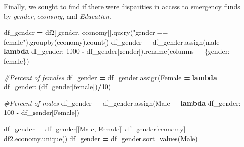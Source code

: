 \documentclass[water,article,submit,moreauthors,pdftex]{mdpi}
\newenvironment{Shaded}{\begin{snugshade}}{\end{snugshade}}
\newcommand{\CommentTok}[1]{\textcolor[rgb]{0.56,0.35,0.01}{\textit{#1}}}
\newcommand{\DecValTok}[1]{\textcolor[rgb]{0.00,0.00,0.81}{#1}}
\newcommand{\KeywordTok}[1]{\textcolor[rgb]{0.13,0.29,0.53}{\textbf{#1}}}
\newcommand{\NormalTok}[1]{#1}
\newcommand{\OperatorTok}[1]{\textcolor[rgb]{0.81,0.36,0.00}{\textbf{#1}}}
\newcommand{\StringTok}[1]{\textcolor[rgb]{0.31,0.60,0.02}{#1}}
\begin{document}
Finally, we sought to find if there were disparities in access to
emergency funds by \emph{gender}, \emph{economy}, and \emph{Education}.

\begin{Shaded}
\begin{Highlighting}[]
\NormalTok{df\_gender }\OperatorTok{=}\NormalTok{ df2[[}\StringTok{\textquotesingle{}gender\textquotesingle{}}\NormalTok{, }\StringTok{\textquotesingle{}economy\textquotesingle{}}\NormalTok{]].query(}\StringTok{"gender == \textquotesingle{}female\textquotesingle{}"}\NormalTok{).groupby(}\StringTok{\textquotesingle{}economy\textquotesingle{}}\NormalTok{).count()}
\NormalTok{df\_gender }\OperatorTok{=}\NormalTok{ df\_gender.assign(male }\OperatorTok{=} \KeywordTok{lambda}\NormalTok{ df\_gender: }\DecValTok{1000} \OperatorTok{{-}}\NormalTok{ df\_gender[}\StringTok{\textquotesingle{}gender\textquotesingle{}}\NormalTok{]).rename(columns }\OperatorTok{=}\NormalTok{ \{}\StringTok{\textquotesingle{}gender\textquotesingle{}}\NormalTok{: }\StringTok{\textquotesingle{}female\textquotesingle{}}\NormalTok{\})}
 
\CommentTok{\#Percent of females}
\NormalTok{df\_gender }\OperatorTok{=}\NormalTok{ df\_gender.assign(Female }\OperatorTok{=} \KeywordTok{lambda}\NormalTok{ df\_gender: (df\_gender[}\StringTok{\textquotesingle{}female\textquotesingle{}}\NormalTok{])}\OperatorTok{/}\DecValTok{10}\NormalTok{)}
 
\CommentTok{\#Percent of males}
\NormalTok{df\_gender }\OperatorTok{=}\NormalTok{ df\_gender.assign(Male }\OperatorTok{=} \KeywordTok{lambda}\NormalTok{ df\_gender: }\DecValTok{100} \OperatorTok{{-}}\NormalTok{ df\_gender[}\StringTok{\textquotesingle{}Female\textquotesingle{}}\NormalTok{])}
 
\NormalTok{df\_gender }\OperatorTok{=}\NormalTok{ df\_gender[[}\StringTok{\textquotesingle{}Male\textquotesingle{}}\NormalTok{, }\StringTok{\textquotesingle{}Female\textquotesingle{}}\NormalTok{]]}
\NormalTok{df\_gender[}\StringTok{\textquotesingle{}economy\textquotesingle{}}\NormalTok{] }\OperatorTok{=}\NormalTok{ df2.economy.unique()}
\NormalTok{df\_gender }\OperatorTok{=}\NormalTok{ df\_gender.sort\_values(}\StringTok{\textquotesingle{}Male\textquotesingle{}}\NormalTok{)}
 

\end{Highlighting}
\end{Shaded}
\end{document}
